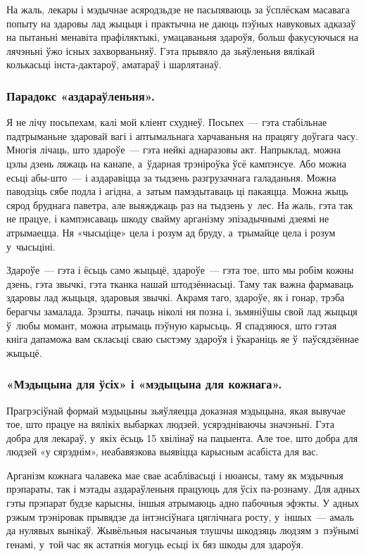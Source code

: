 На жаль, лекары і мэдычнае асяродзьдзе не пасьпяваюць за ўсплёскам масавага попыту на здаровы лад жыцьця і практычна не даюць пэўных навуковых адказаў на пытаньні менавіта прафіляктыкі, умацаваньня здароўя, больш факусуючыся на лячэньні ўжо існых захворваньняў. Гэта прывяло да зьяўленьня вялікай колькасьці інста-дактароў, аматараў і шарлятанаў.

\subsubsection{Парадокс «аздараўленьня».} 

Я не лічу посьпехам, калі мой кліент схуднеў. Посьпех~--- гэта стабільнае падтрыманьне здаровай вагі і аптымальнага харчаваньня на працягу доўгага часу. Многія лічаць, што здароўе~--- гэта нейкі аднаразовы акт. Напрыклад, можна цэлы дзень ляжаць на канапе, а~ўдарная трэніроўка ўсё кампэнсуе. Або можна есьці абы-што~--- і аздаравіцца за тыдзень разгрузачнага галаданьня. Можна паводзіць сябе подла і агідна, а~затым памэдытаваць ці пакаяцца. Можна жыць сярод бруднага паветра, але выяжджаць раз на тыдзень у~лес. На жаль, гэта так не працуе, і кампэнсаваць шкоду свайму арганізму эпізадычнымі дзеямі не атрымаецца. Ня «чысьціце» цела і розум ад бруду, а~трымайце цела і розум у~чысьціні.

Здароўе~--- гэта і ёсьць само жыцьцё, здароўе~--- гэта тое, што мы робім кожны дзень, гэта звычкі, гэта тканка нашай штодзённасьці. Таму так важна фармаваць здаровы лад жыцьця, здаровыя звычкі. Акрамя таго, здароўе, як і гонар, трэба берагчы замалада. Зрэшты, пачаць ніколі ня позна і, зьмяніўшы свой лад жыцьця ў~любы момант, можна атрымаць пэўную карысьць. Я спадзяюся, што гэтая кніга дапаможа вам скласьці сваю сыстэму здароўя і ўкараніць яе ў~паўсядзённае жыцьцё.

\subsubsection{«Мэдыцына для ўсіх» і «мэдыцына для кожнага».}

Прагрэсіўнай формай мэдыцыны зьяўляецца доказная мэдыцына, якая вывучае тое, што працуе на вялікіх выбарках людзей, усярэдніваючы значэньні. Гэта добра для лекараў, у~якіх ёсьць 15 хвілінаў на пацыента. Але тое, што добра для людзей «у сярэднім», неабавязкова выявіцца карысным асабіста для вас.

Арганізм кожнага чалавека мае свае асаблівасьці і нюансы, таму як мэдычныя прэпараты, так і мэтады аздараўленьня працуюць для ўсіх па-рознаму. Для адных гэты прэпарат будзе карысны, іншыя атрымаюць адно пабочныя эфэкты. У адных рэжым трэніровак прывядзе да інтэнсіўнага цяглічнага росту, у~іншых~--- амаль да нулявых вынікаў. Жывёльныя насычаныя тлушчы шкодзяць людзям з~пэўнымі генамі, у~той час як астатнія могуць есьці іх бяз шкоды для здароўя.

